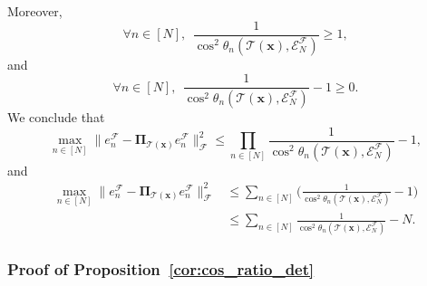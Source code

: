 \documentclass[twoside,11pt]{book}
\numberwithin{theorem}{chapter}
\numberwithin{definition}{chapter}
\numberwithin{proposition}{chapter}
\numberwithin{corollary}{chapter}
\numberwithin{example}{chapter}
\numberwithin{lemma}{chapter}
\numberwithin{assumption}{chapter}
\numberwithin{equation}{chapter}
\numberwithin{figure}{chapter}
\DeclareMathOperator{\F}{\mathcal{F}}
\begin{document}
Moreover, 
\begin{equation}
\forall n \in [N], \:\:\frac{1}{\cos^{2} \theta_{n}(\mathcal{T}(\bm{x}),\mathcal{E}^{\mathcal{F}}_{N}) } \geq 1,
\end{equation}
and
\begin{equation}
\forall n \in [N], \:\:\frac{1}{\cos^{2} \theta_{n}(\mathcal{T}(\bm{x}),\mathcal{E}^{\mathcal{F}}_{N}) } -1 \geq 0.
\end{equation}
We conclude that
\begin{equation}
\max_{ n \in [N]} \|e_{n}^{\F} - \bm{\Pi}_{\mathcal{T}(\bm{x})} e_{n}^{\F}\|_{\mathcal{F}}^{2} \leq \prod\limits_{n \in [N]} \frac{1}{\cos^{2} \theta_{n}(\mathcal{T}(\bm{x}),\mathcal{E}^{\mathcal{F}}_{N}) } -1,
\end{equation}
and
\begin{align}
\max_{ n \in [N]} \|e_{n}^{\F} - \bm{\Pi}_{\mathcal{T}(\bm{x})} e_{n}^{\F}\|_{\mathcal{F}}^{2} & \leq \sum\limits_{n \in [N]} \Big( \frac{1}{\cos^{2} \theta_{n}(\mathcal{T}(\bm{x}),\mathcal{E}^{\mathcal{F}}_{N}) } -1\Big)\\
& \leq \sum\limits_{n \in [N]} \frac{1}{\cos^{2} \theta_{n}(\mathcal{T}(\bm{x}),\mathcal{E}^{\mathcal{F}}_{N}) } -N.
\end{align}
\subsubsection{Proof of Proposition~\ref{cor:cos_ratio_det}}
\end{document}
